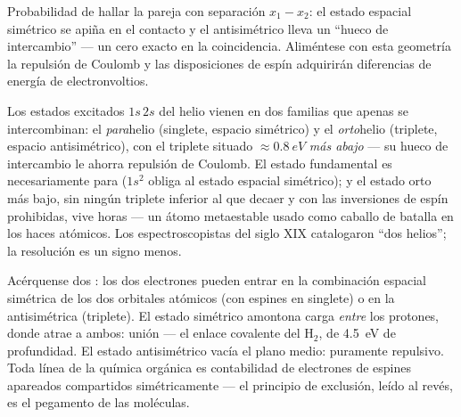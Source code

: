 \begin{omfigure}

{\small Probabilidad de hallar la pareja con separación $x_1 - x_2$:
el estado espacial simétrico se apiña en el contacto y el antisimétrico
lleva un ``hueco de intercambio'' --- un cero exacto en la coincidencia.
Aliméntese con esta geometría la repulsión de Coulomb y las disposiciones de
espín adquirirán diferencias de energía de electronvoltios.}
\end{omfigure}

\begin{example}\label{ex:b3:identical-particles:helium}
Los estados excitados $1s\,2s$ del helio vienen en dos familias que apenas
se intercombinan: el \emph{para}helio (singlete, espacio simétrico) y el
\emph{orto}helio (triplete, espacio antisimétrico), con el triplete situado
$\approx\qty{0.8}{eV}$ \emph{más abajo} --- su hueco de intercambio le
ahorra repulsión de Coulomb. El estado fundamental es necesariamente para
($1s^2$ obliga al estado espacial simétrico); y el estado orto más bajo, sin
ningún triplete inferior al que decaer y con las inversiones de espín
prohibidas, vive horas --- un átomo metaestable usado como caballo de
batalla en los haces atómicos. Los espectroscopistas del siglo XIX
catalogaron ``dos helios''; la resolución es un signo menos.
\end{example}

\begin{example}\label{ex:b3:identical-particles:bond}
Acérquense dos : los dos electrones pueden entrar en la
combinación espacial simétrica de los dos orbitales atómicos (con espines en
singlete) o en la antisimétrica (triplete). El estado simétrico amontona
carga \emph{entre} los protones, donde atrae a ambos: unión --- el enlace
covalente del H$_2$, de \qty{4.5}{eV} de profundidad. El estado
antisimétrico vacía el plano medio: puramente repulsivo. Toda línea de la
química orgánica es contabilidad de electrones de espines apareados
compartidos simétricamente --- el principio de exclusión, leído al revés, es
el pegamento de las moléculas.
\end{example}

